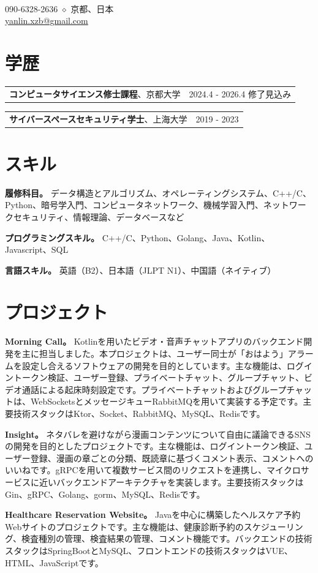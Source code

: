 \documentclass[letterpaper,11pt]{article}
\makeatletter
\newcommand{\resumeHeader}[3]{%
  \begin{center}
    {\LARGE\bfseries #1}\\[0.35em]
    #2\\[0.25em]
    #3
  \end{center}
  \vspace{0.55em}
}
\newcommand{\educationEntry}[3]{%
  \noindent
  \begin{tabular*}{\textwidth}{@{}l@{\extracolsep{\fill}}r@{}}
    #1、#2 & #3 \\
  \end{tabular*}
  \vspace{1.1em}
}
\newcommand{\skillLine}[2]{%
  \textbf{#1。} #2\par\vspace{0.45em}
}
\newcommand{\projectEntry}[2]{%
  \textbf{#1。} #2\par\vspace{0.85em}
}
\makeatother
\begin{document}
\resumeHeader
  {}
  {090-6328-2636 $\diamond$ 京都、日本}
  {\href{mailto:yanlin.xzb@gmail.com}{yanlin.xzb@gmail.com}}

\section{学歴}

\educationEntry
  {\textbf{コンピュータサイエンス修士課程}}
  {京都大学}
  {2024.4 - 2026.4 修了見込み}

\educationEntry
  {\textbf{サイバースペースセキュリティ学士}}
  {上海大学}
  {2019 - 2023}

\section{スキル}

\skillLine{履修科目}{データ構造とアルゴリズム、オペレーティングシステム、C++/C、Python、暗号学入門、コンピュータネットワーク、機械学習入門、ネットワークセキュリティ、情報理論、データベースなど}

\skillLine{プログラミングスキル}{C++/C、Python、Golang、Java、Kotlin、Javascript、SQL}

\skillLine{言語スキル}{英語（B2）、日本語（JLPT N1）、中国語（ネイティブ）}

\section{プロジェクト}

\projectEntry{Morning Call}{Kotlinを用いたビデオ・音声チャットアプリのバックエンド開発を主に担当しました。本プロジェクトは、ユーザー同士が「おはよう」アラームを設定し合えるソフトウェアの開発を目的としています。主な機能は、ログイントークン検証、ユーザー登録、プライベートチャット、グループチャット、ビデオ通話による起床時刻設定です。プライベートチャットおよびグループチャットは、WebSocketsとメッセージキューRabbitMQを用いて実装する予定です。主要技術スタックはKtor、Socket、RabbitMQ、MySQL、Redisです。}

\projectEntry{Insight}{ネタバレを避けながら漫画コンテンツについて自由に議論できるSNSの開発を目的としたプロジェクトです。主な機能は、ログイントークン検証、ユーザー登録、漫画の章ごとの分類、既読章に基づくコメント表示、コメントへのいいねです。gRPCを用いて複数サービス間のリクエストを連携し、マイクロサービスに近いバックエンドアーキテクチャを実装します。主要技術スタックはGin、gRPC、Golang、gorm、MySQL、Redisです。}

\projectEntry{Healthcare Reservation Website}{Javaを中心に構築したヘルスケア予約Webサイトのプロジェクトです。主な機能は、健康診断予約のスケジューリング、検査種別の管理、検査結果の管理、コメント機能です。バックエンドの技術スタックはSpringBootとMySQL、フロントエンドの技術スタックはVUE、HTML、JavaScriptです。}
\end{document}
